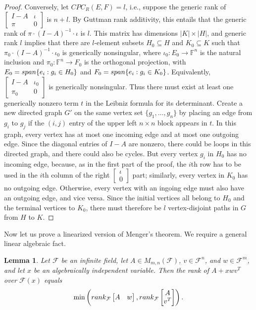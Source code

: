 \documentclass[10pt,a4paper]{amsart}
\newtheorem{lem}[thm]{Lemma}
\begin{document}
\begin{proof}
Conversely, let $CPC_R(E, F) = l$, i.e., suppose the generic rank of $\left[\begin{matrix}I - A& \iota\\ \pi&0\end{matrix}\right]$ is $n + l$. By Guttman rank additivity, this entails that the generic rank of $\pi\cdot (I - A)^{-1}\cdot \iota$ is $l$. This matrix has dimensions $|K| \times |H|$, and generic rank $l$ implies that there are $l$-element subsets $H_0 \subseteq H$ and $K_0 \subseteq K$ such that $\pi_0\cdot (I-A)^{-1}\cdot \iota_0$ is generically nonsingular, where $\iota_0: E_0 \to \mathbb{F}^n$ is the natural inclusion and $\pi_0: \mathbb{F}^n \to F_0$ is the orthogonal projection, with $E_0 = {\rm span}\{e_i: g_i \in H_0\}$ and $F_0 = {\rm span}\{e_i: g_i \in K_0\}$. Equivalently, $\left[\begin{matrix}I - A& \iota_0\\ \pi_0&0\end{matrix}\right]$ is generically nonsingular. Thus there must exist at least one generically nonzero term $t$ in the Leibniz formula for its determinant. Create a new directed graph $G'$ on the same vertex set $\{g_1, \ldots, g_n\}$ by placing an edge from $g_i$ to $g_j$ if the $(i,j)$ entry of the upper left $n\times n$ block appears in $t$. In this graph, every vertex has at most one incoming edge and at most one outgoing edge. Since the diagonal entries of $I - A$ are nonzero, there could be loops in this directed graph, and there could also be cycles. But every vertex $g_i$ in $H_0$ has no incoming edge, because, as in the first part of the proof, the $i$th row has to be used in the $i$th column of the right $\left[\begin{matrix}\iota \\ 0\end{matrix}\right]$ part; similarly, every vertex in $K_0$ has no outgoing edge. Otherwise, every vertex with an ingoing edge must also have an outgoing edge, and vice versa. Since the initial vertices all belong to $H_0$ and the terminal vertices to $K_0$, there must therefore be $l$ vertex-disjoint paths in $G$ from $H$ to $K$.
\end{proof}

Now let us prove a linearized version of Menger's theorem. We require a general linear algebraic fact.

\begin{lem}\label{ranklem}
Let $\mathcal{F}$ be an infinite field, let $A \in M_{m,n}(\mathcal{F})$, $v \in \mathcal{F}^n$, and $w \in \mathcal{F}^m$, and let $x$ be an algebraically independent variable. Then the rank of $A + xwv^T$ over $\mathcal{F}(x)$ equals $$\min\left({\rm rank}_{\mathcal{F}}\left[\begin{matrix} A&w\end{matrix}\right], {\rm rank}_{\mathcal{F}}\left[\begin{matrix} A\\ v^T\end{matrix}\right]\right).$$
\end{lem}
\end{document}

